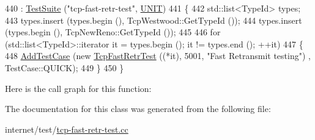 \begin{DoxyCode}
440                           : \hyperlink{classns3_1_1TestSuite_a904b0c40583b744d30908aeb94636d1a}{TestSuite} (\textcolor{stringliteral}{"tcp-fast-retr-test"}, \hyperlink{classns3_1_1TestSuite_a1ebfcab34ec8161e085e8e3a1855eae0a3885375a3787abf60431f8454b3cadbd}{UNIT})
441   \{
442     std::list<TypeId> types;
443     types.insert (types.begin (), TcpWestwood::GetTypeId ());
444     types.insert (types.begin (), TcpNewReno::GetTypeId ());
445 
446     \textcolor{keywordflow}{for} (std::list<TypeId>::iterator it = types.begin (); it != types.end (); ++it)
447       \{
448         \hyperlink{classns3_1_1TestCase_a3718088e3eefd5d6454569d2e0ddd835}{AddTestCase} (\textcolor{keyword}{new} \hyperlink{classTcpFastRetrTest}{TcpFastRetrTest} ((*it), 5001, \textcolor{stringliteral}{"Fast Retransmit testing"})
      , TestCase::QUICK);
449       \}
450   \}
\end{DoxyCode}


Here is the call graph for this function\+:




The documentation for this class was generated from the following file\+:\begin{DoxyCompactItemize}
\item 
internet/test/\hyperlink{tcp-fast-retr-test_8cc}{tcp-\/fast-\/retr-\/test.\+cc}\end{DoxyCompactItemize}
